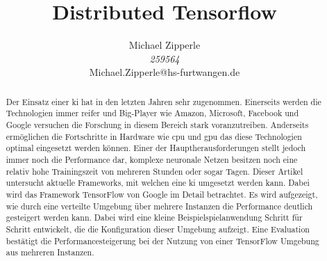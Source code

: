 \documentclass[journal]{IEEEtran}
\begin{document}
\title{Distributed Tensorflow}

\author{\begin{center}
 Michael Zipperle \\ 
 \textit{259564} \\
 Michael.Zipperle@hs-furtwangen.de \\
\end{center}}%
        

\maketitle


\begin{abstract}
Der Einsatz einer \ac{ki} hat in den letzten Jahren sehr zugenommen. Einerseits werden die Technologien immer reifer und Big-Player wie Amazon, Microsoft, Facebook und Google versuchen die Forschung in diesem Bereich stark voranzutreiben. Anderseits ermöglichen die Fortschritte in Hardware wie \acs{cpu} und \acs{gpu} das diese Technologien optimal eingesetzt werden können. Einer der Hauptherausforderungen stellt jedoch immer noch die Performance dar, komplexe neuronale Netzen besitzen noch eine relativ hohe Trainingszeit von mehreren Stunden oder sogar Tagen. Dieser Artikel untersucht aktuelle Frameworks, mit welchen eine \ac{ki} umgesetzt werden kann. Dabei wird das Framework TensorFlow von Google im Detail betrachtet. Es wird aufgezeigt, wie durch eine verteilte Umgebung über mehrere Instanzen die Performance deutlich gesteigert werden kann. Dabei wird eine kleine Beispielspielanwendung Schritt für Schritt entwickelt, die die Konfiguration dieser Umgebung aufzeigt. Eine Evaluation bestätigt die Performancesteigerung bei der Nutzung von einer TensorFlow Umgebung aus mehreren Instanzen. 

\end{abstract}
\IEEEpeerreviewmaketitle











\ifCLASSOPTIONcaptionsoff
  \newpage
\fi
\end{document}
